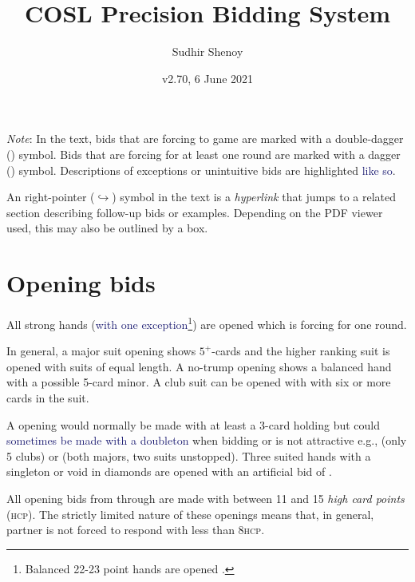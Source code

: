 \documentclass[a4paper,article,oneside]{memoir}
\newcommand{\gap}{\vspace{\baselineskip}}
\newcommand{\hcp}{\textsc{hcp}}
\newcommand{\orf}[1]{#1\textcolor{ForestGreen}{\dag}} %
\newcommand{\gf}[1]{#1\textcolor{Orange}{\ddag}} %
\newcommand{\excp}[1]{\textcolor{MidnightBlue}{#1}} %
\newcommand{\hyp}[1]{\hyperlink{#1}{$\hookrightarrow$}} %
\begin{document}
\title{COSL Precision Bidding System}
\author{Sudhir Shenoy}
\date{v2.70, 6 June 2021}
\maketitle

\tableofcontents

\gap\gap

\emph{Note}: In the text, bids that are forcing to game are marked
with a double-dagger (\gf{}) symbol. Bids that are forcing for at
least one round are marked with a dagger (\orf{}) symbol. Descriptions
of exceptions or unintuitive bids are highlighted \excp{like so}.

An right-pointer (\hyp{}) symbol in the text is a \emph{hyperlink} that
jumps to a related section describing follow-up bids or
examples. Depending on the PDF viewer used, this may also be outlined
by a box.

\pagebreak

\section{Opening bids}

All strong hands (\excp{with one exception\footnote{Balanced 22-23
    point hands are opened \Nt{2}.}}) are opened \orf{} which is
forcing for one round.

In general, a major suit opening shows $5^+$-cards and the higher
ranking suit is opened with suits of equal length. A no-trump opening
shows a balanced hand with a possible 5-card minor. A club suit can be
opened with  with six or more cards in the suit.

A  opening would normally be made with at least a 3-card holding
but could \excp{sometimes be made with a doubleton} when bidding
 or  is not attractive e.g., 
(only 5 clubs) or  (both majors, two suits
unstopped). Three suited hands with a singleton or void in diamonds
are opened with an artificial bid of .

All opening bids from  through  are made with between 11
and 15 \emph{high card points} (\hcp). The strictly limited nature of
these openings means that, in general, partner is not forced to
respond with less than 8\hcp.
\end{document}
